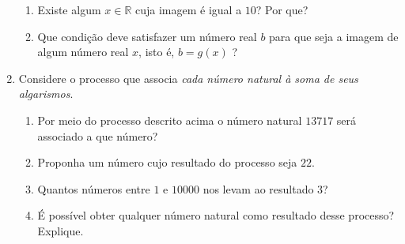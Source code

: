 \begin{enumerate}
\begin{enumerate}
\item {} 
Existe algum \(x\in \mathbb{R}\) cuja imagem é igual a $10$? Por que?

\item {} 
Que condição deve satisfazer um número real \(b\) para que seja a imagem de algum número real \(x\), isto é, \(b=g(x)\) ?

\end{enumerate}

\item Considere o processo que associa \emph{cada número natural à soma de seus algarismos}.
\begin{enumerate}
\item {} 
Por meio do processo descrito acima o número natural \(13717\) será associado a que número?

\item {} 
Proponha um número cujo resultado do processo seja \(22\).

\item {} 
Quantos números entre \(1\) e \(10000\) nos levam ao resultado \(3\)?

\item {} 
É possível obter qualquer número natural como resultado desse processo? Explique.

\end{enumerate}
\end{enumerate}


